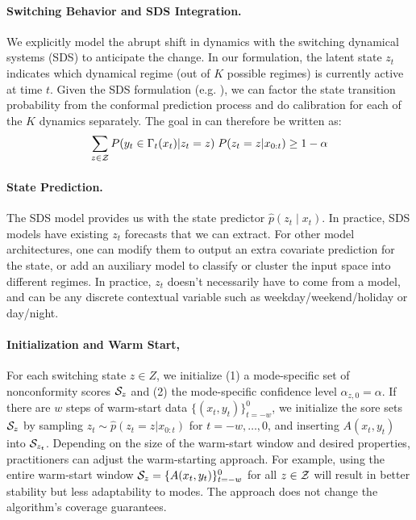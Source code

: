 \vspace{-0.5em}
\paragraph{Switching Behavior and SDS Integration.}
We explicitly model the abrupt shift in dynamics with the switching dynamical systems (SDS) to anticipate the change. In our formulation, the latent state \(z_t\) indicates which dynamical regime (out of \(K\) possible regimes) is currently active at time \(t\). Given the SDS formulation (e.g. ), we can factor the state transition probability from the conformal prediction process and do calibration for each of the $K$ dynamics separately. The goal in  can therefore be written as:
%
\begin{equation}
    \sum_{z\in{\mathcal{Z}}} P(y_t \in \Gamma_t(x_t)| z_t=z) \; P(z_t = z|x_{0:t}) \geq 1-\alpha 
\label{eq:factored_goal}
\end{equation}
\vspace{-1.2em}
\paragraph{State Prediction.} The SDS model provides us with the state predictor \(\hat{p}(z_t \mid x_t)\). In practice, SDS models \cite{ansari2021deep, linderman2016recurrent} have existing $z_t$ forecasts that we can extract. For other model architectures, one can modify them to output an extra covariate prediction for the state, or add an auxiliary model to classify or cluster the input space into different regimes. In practice, $z_t$ doesn’t necessarily have to come from a model, and can be any discrete contextual variable such as weekday/weekend/holiday or day/night.

\vspace{-0.5em}
\paragraph{Initialization and Warm Start,} For each switching state $z \in Z$, we initialize (1) a mode-specific set of nonconformity scores ${\mathcal{S}}_z$ and (2) the mode-specific confidence level $\alpha_{z,0} = \alpha$. If there are $w$ steps of warm-start data $\{(x_t,y_t)\}_{t=-w}^0$, we initialize the sore sets ${\mathcal{S}}_z$ by sampling $z_t \sim \hat{p}(z_t = z |x_{0:t})$ for $t= -w, \ldots, 0$, and inserting $A(x_t,y_t)$ into ${\mathcal{S}}_{z_t}$. Depending on the size of the warm-start window and desired properties, practitioners can adjust the warm-starting approach. For example, using the entire warm-start window ${\mathcal{S}}_{z} = \{A(x_t,y_t)\}_{t=-w}^0$  for all $z \in {\mathcal{Z}}$  will result in better stability but less adaptability to modes. The approach does not change the algorithm's coverage guarantees. 

